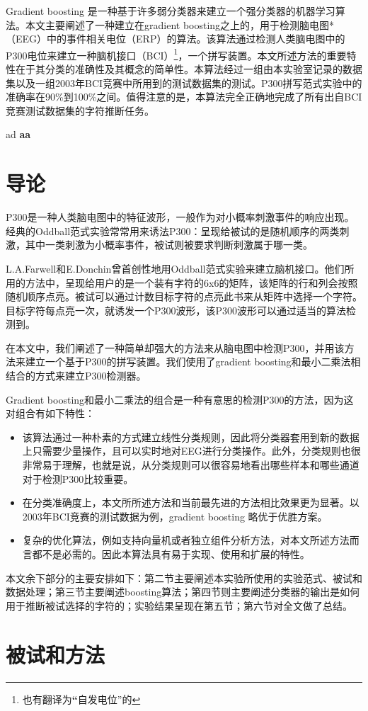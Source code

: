 \documentclass[a4paper]{ecusttrans}
\newcommand\testee[2]{
  \fontsize{14}{\baselineskip}\selectfont #1
  \textbf{#2}
  }
\begin{document}
  \setlength{\parindent}{2em}

  \begin{cAbstract}
  Gradient boosting 是一种基于许多弱分类器来建立一个强分类器的机器学习算法。本文主要阐述了一种建立在gradient boosting之上的，用于检测脑电图*（EEG）中的事件相关电位（ERP）的算法。该算法通过检测人类脑电图中的P300电位来建立一种脑机接口（BCI）\footnote{也有翻译为{\textbf “自发电位”}的}，一个拼写装置。本文所述方法的重要特性在于其分类的准确性及其概念的简单性。本算法经过一组由本实验室记录的数据集以及一组2003年BCI竞赛中所用到的测试数据集的测试。P300拼写范式实验中的准确率在90\%到100\%之间。值得注意的是，本算法完全正确地完成了所有出自BCI竞赛测试数据集的字符推断任务。

  \end{cAbstract}

  \testee{ad}{aa}

  \section{导论}
  \xiaosihao
  P300是一种人类脑电图中的特征波形，一般作为对小概率刺激事件的响应出现。经典的Oddball范式实验常常用来诱法P300：呈现给被试的是随机顺序的两类刺激，其中一类刺激为小概率事件，被试则被要求判断刺激属于哪一类。

  L.A.Farwell和E.Donchin曾首创性地用Oddball范式实验来建立脑机接口。他们所用的方法中，呈现给用户的是一个装有字符的6x6的矩阵，该矩阵的行和列会按照随机顺序点亮。被试可以通过计数目标字符的点亮此书来从矩阵中选择一个字符。目标字符每点亮一次，就诱发一个P300波形，该P300波形可以通过适当的算法检测到。

  在本文中，我们阐述了一种简单却强大的方法来从脑电图中检测P300，并用该方法来建立一个基于P300的拼写装置。我们使用了gradient boosting和最小二乘法相结合的方式来建立P300检测器。

  Gradient boosting和最小二乘法的组合是一种有意思的检测P300的方法，因为这对组合有如下特性：

  \begin{itemize}
    \item 该算法通过一种朴素的方式建立线性分类规则，因此将分类器套用到新的数据上只需要少量操作，且可以实时地对EEG进行分类操作。此外，分类规则也很非常易于理解，也就是说，从分类规则可以很容易地看出哪些样本和哪些通道对于检测P300比较重要。
    \item 在分类准确度上，本文所所述方法和当前最先进的方法相比效果更为显著。以2003年BCI竞赛的测试数据为例，gradient boosting 略优于优胜方案。
    \item 复杂的优化算法，例如支持向量机或者独立组件分析方法，对本文所述方法而言都不是必需的。因此本算法具有易于实现、使用和扩展的特性。
  \end{itemize}

  本文余下部分的主要安排如下：第二节主要阐述本实验所使用的实验范式、被试和数据处理；第三节主要阐述boosting算法；第四节则主要阐述分类器的输出是如何用于推断被试选择的字符的；实验结果呈现在第五节；第六节对全文做了总结。
  \section{被试和方法}
\end{document}

